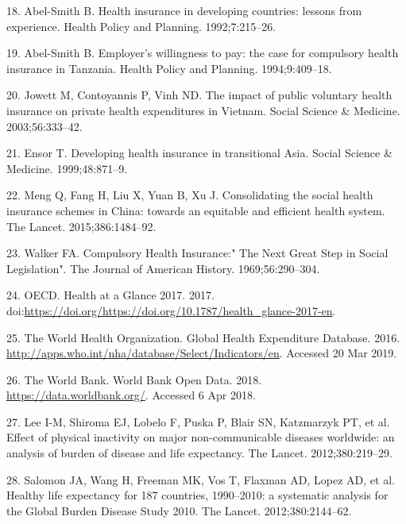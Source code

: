 \documentclass[]{elsarticle} %
\begin{document}
\leavevmode\hypertarget{ref-abel1992health}{}%
18. Abel-Smith B. Health insurance in developing countries: lessons from experience. Health Policy and Planning. 1992;7:215--26.

\leavevmode\hypertarget{ref-abel1994employer}{}%
19. Abel-Smith B. Employer's willingness to pay: the case for compulsory health insurance in Tanzania. Health Policy and Planning. 1994;9:409--18.

\leavevmode\hypertarget{ref-jowett2003impact}{}%
20. Jowett M, Contoyannis P, Vinh ND. The impact of public voluntary health insurance on private health expenditures in Vietnam. Social Science \& Medicine. 2003;56:333--42.

\leavevmode\hypertarget{ref-ensor1999developing}{}%
21. Ensor T. Developing health insurance in transitional Asia. Social Science \& Medicine. 1999;48:871--9.

\leavevmode\hypertarget{ref-meng2015consolidating}{}%
22. Meng Q, Fang H, Liu X, Yuan B, Xu J. Consolidating the social health insurance schemes in China: towards an equitable and efficient health system. The Lancet. 2015;386:1484--92.

\leavevmode\hypertarget{ref-walker1969compulsory}{}%
23. Walker FA. Compulsory Health Insurance:" The Next Great Step in Social Legislation". The Journal of American History. 1969;56:290--304.

\leavevmode\hypertarget{ref-healthglance2017}{}%
24. OECD. Health at a Glance 2017. 2017. doi:\href{https://doi.org/https://doi.org/https://doi.org/10.1787/health_glance-2017-en}{https://doi.org/https://doi.org/10.1787/health\_glance-2017-en}.

\leavevmode\hypertarget{ref-WHOdata}{}%
25. The World Health Organization. Global Health Expenditure Database. 2016. \url{http://apps.who.int/nha/database/Select/Indicators/en}. Accessed 20 Mar 2019.

\leavevmode\hypertarget{ref-worldbank}{}%
26. The World Bank. World Bank Open Data. 2018. \url{https://data.worldbank.org/}. Accessed 6 Apr 2018.

\leavevmode\hypertarget{ref-lee2012effect}{}%
27. Lee I-M, Shiroma EJ, Lobelo F, Puska P, Blair SN, Katzmarzyk PT, et al. Effect of physical inactivity on major non-communicable diseases worldwide: an analysis of burden of disease and life expectancy. The Lancet. 2012;380:219--29.

\leavevmode\hypertarget{ref-salomon2012healthy}{}%
28. Salomon JA, Wang H, Freeman MK, Vos T, Flaxman AD, Lopez AD, et al. Healthy life expectancy for 187 countries, 1990--2010: a systematic analysis for the Global Burden Disease Study 2010. The Lancet. 2012;380:2144--62.
\end{document}
